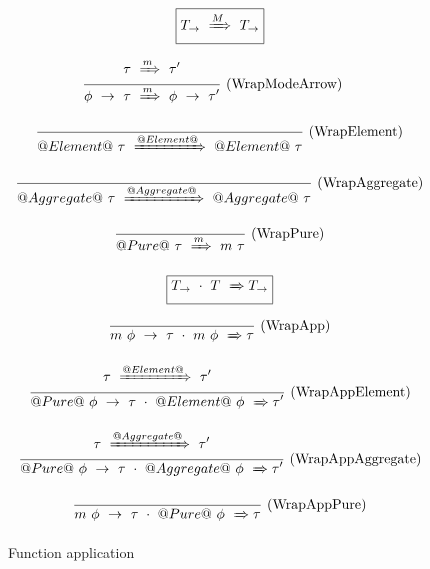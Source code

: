 \begin{figure}

$$
\boxed{T_{\to} ~\xRightarrow{M}~ T_{\to}}
$$

$$
\frac {\displaystyle 
    \tau ~\xRightarrow{m}~ \tau'
} {\displaystyle 
    \phi~\to~\tau ~\xRightarrow{m}~ \phi~\to~\tau'
} \ 
\textrm{(WrapModeArrow)}
\quad
$$

$$
\frac {\displaystyle  } {\displaystyle 
    @Element@~\tau ~\xRightarrow{@Element@}~ @Element@~\tau
} \ 
\textrm{(WrapElement)}
$$

$$
\frac {\displaystyle  } {\displaystyle 
    @Aggregate@~\tau ~\xRightarrow{@Aggregate@}~ @Aggregate@~\tau
} \ 
\textrm{(WrapAggregate)}
$$

$$
\frac {\displaystyle  } {\displaystyle 
    @Pure@~\tau ~\xRightarrow{m}~ m~\tau
} \ 
\textrm{(WrapPure)}
$$


$$
\boxed{T_{\to}~\cdot~T ~\xRightarrow~ T_{\to}}
$$

$$
\frac {\displaystyle 
} {\displaystyle 
    m~\phi~\to~\tau~\cdot~m~\phi ~\xRightarrow~ \tau
} \ 
\textrm{(WrapApp)}
$$


$$
\frac {\displaystyle 
    \tau ~\xRightarrow{@Element@}~ \tau'
} {\displaystyle 
    @Pure@~\phi~\to~\tau~\cdot~@Element@~\phi ~\xRightarrow~ \tau'
} \ 
\textrm{(WrapAppElement)}
$$

$$
\frac {\displaystyle 
    \tau ~\xRightarrow{@Aggregate@}~ \tau'
} {\displaystyle 
    @Pure@~\phi~\to~\tau~\cdot~@Aggregate@~\phi ~\xRightarrow~ \tau'
} \ 
\textrm{(WrapAppAggregate)}
$$

$$
\frac {\displaystyle 
} {\displaystyle 
    m~\phi~\to~\tau~\cdot~@Pure@~\phi ~\xRightarrow~ \tau
} \ 
\textrm{(WrapAppPure)}
$$


\caption{Function application}
\label{fig:source:type:wrap}
\end{figure}

